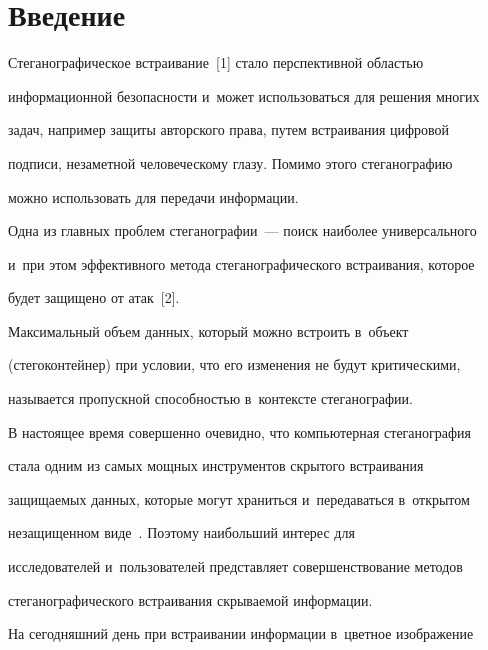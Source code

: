    


  \section{Введение}


  


  Стеганографическое встраивание~[1] стало перспективной областью 


информационной безопасности и~может использоваться для решения многих 


задач, например защиты авторского права, путем встраивания цифровой 


подписи, незаметной человеческому глазу. Помимо этого стеганографию 


можно использовать для передачи информации. 


  


  Одна из главных проблем стеганографии~--- поиск наиболее универсального 


и~при этом эффективного метода стеганографического встраивания, которое 


будет защищено от атак~[2].


  


  Максимальный объем данных, который можно встроить в~объект 


(стегоконтейнер) при условии, что его изменения не будут критическими, 


называется пропускной способностью в~контексте стеганографии.


  


  В настоящее время совершенно очевидно, что компьютерная стеганография 


стала одним из самых мощных инструментов скрытого встраивания 


защищаемых данных, которые могут храниться и~передаваться в~открытом 


незащищенном виде~\cite{3-lin, 4-lin, 5-lin}. Поэтому наибольший интерес для 


исследователей и~пользователей представляет совершенствование методов 


стеганографического встраивания скрываемой информации.


  


  На сегодняшний день при встраивании информации в~цветное изображение 


